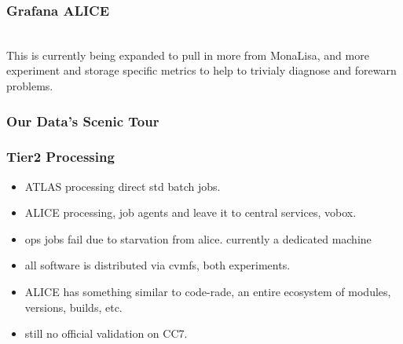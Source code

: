 \documentclass{beamer}
\begin{document}
\begin{frame}
  \frametitle{Grafana ALICE}
  \\
  This is currently being expanded to pull in more from MonaLisa, and more experiment and storage specific
  metrics to help to trivialy diagnose and forewarn problems.
\end{frame}

\begin{frame}
  \frametitle{Our Data's Scenic Tour}
\end{frame}

\begin{frame}
  \frametitle{Tier2 Processing}
  \begin{itemize}
    \item ATLAS processing direct std batch jobs.
    \item ALICE processing, job agents and leave it to central services, vobox.
    \item ops jobs fail due to starvation from alice. currently a dedicated machine
    \item all software is distributed via cvmfs, both experiments.
    \item ALICE has something similar to code-rade, an entire ecosystem of modules, versions, builds, etc.
    \item still no official validation on CC7.
  \end{itemize}
\end{frame}
\end{document}
